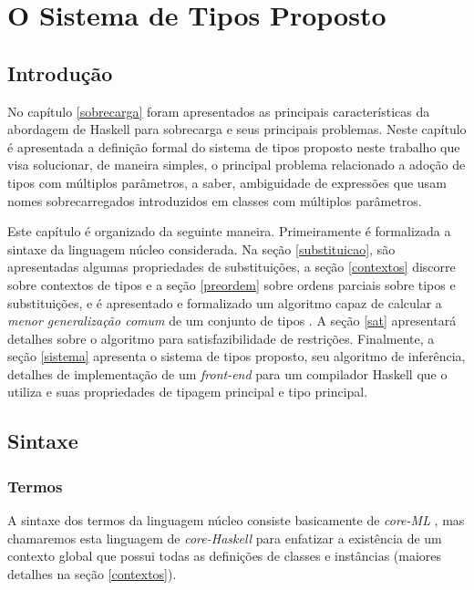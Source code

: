 \chapter{O Sistema de Tipos Proposto}\label{capmptc}

\section{Introdu\c{c}\~ao}

No cap\'itulo \ref{sobrecarga} foram apresentados as principais caracter\'isticas da abordagem de Haskell para sobrecarga
e seus principais problemas. Neste cap\'itulo \'e apresentada a defini\c{c}\~ao formal do sistema de tipos proposto 
neste trabalho que visa solucionar, de maneira simples, o principal problema relacionado a ado\c{c}\~ao de tipos com
m\'ultiplos par\^ametros, a saber, ambiguidade de express\~oes que usam nomes sobrecarregados introduzidos em classes 
com m\'ultiplos par\^ametros.

Este cap\'itulo \'e organizado da seguinte maneira. Primeiramente \'e formalizada a sintaxe da linguagem n\'ucleo
considerada. Na se\c{c}\~ao \ref{substituicao}, s\~ao apresentadas algumas propriedades de substitui\c{c}\~oes, a
se\c{c}\~ao \ref{contextos} discorre sobre contextos de tipos e a se\c{c}\~ao \ref{preordem} sobre ordens parciais
sobre tipos e substitui\c{c}\~oes, e \'e apresentado e formalizado um algoritmo capaz de calcular a 
\emph{menor generaliza\c{c}\~ao comum} de um conjunto de tipos \cite{Camarao99a}. A se\c{c}\~ao \ref{sat} 
apresentar\'a detalhes sobre o algoritmo para satisfazibilidade de restri\c{c}\~oes. Finalmente, a se\c{c}\~ao 
\ref{sistema} apresenta o sistema de tipos proposto, seu algoritmo de infer\^encia, detalhes de implementa\c{c}\~ao de
um \emph{front-end} para um compilador Haskell que o utiliza e suas propriedades de tipagem principal e tipo principal.  

\section {Sintaxe}\label{sintaxe}

\subsection{Termos}

A sintaxe dos termos da linguagem n\'ucleo consiste basicamente de \emph{core-ML} \cite{Milner79, Damas82}, mas
chamaremos esta linguagem de \emph{core-Haskell} para enfatizar a exist\^encia de um contexto global que possui todas 
as defini\c{c}\~oes de classes e inst\^ancias (maiores detalhes na se\c{c}\~ao \ref{contextos}). 

